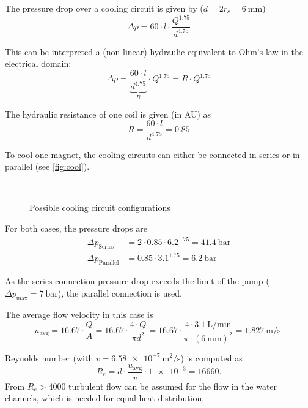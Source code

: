 \documentclass[10pt,a4paper,noendnumber=true]{scrartcl}
\begin{document}
The pressure drop over a cooling circuit is given by ($d=2r_c=\SI{6}{\mm}$)
\begin{equation}
    \Delta p = 60 \cdot l \cdot \frac{Q^{1.75}}{d^{4.75}} 
\end{equation}

This can be interpreted a (non-linear) hydraulic equivalent to Ohm's law in the electrical domain:
\begin{equation}
	\Delta p = \underbrace{\frac{60 \cdot l}{d^{4.75}}}_R \cdot Q^{1.75} = R \cdot Q^{1.75}
\end{equation}

The hydraulic resistance of one coil is given (in AU) as
\begin{equation}
R= \frac{60 \cdot l}{d^{4.75}} = 0.85
\end{equation}

To cool one magnet, the cooling circuits can either be connected in series or in parallel (see \autoref{fig:cool}).

\begin{figure}[H]
	\centering\setcounter{subfigure}{0}
	\\
	\caption{Possible cooling circuit configurations}\label{fig:cool}
\end{figure}

For both cases, the pressure drops are
\begin{align}
\Delta p_\text{Series} &= 2 \cdot 0.85 \cdot 6.2^{1.75} = \SI{41.4}{\bar} \\
\Delta p_\text{Parallel} &= 0.85 \cdot 3.1^{1.75} = \SI{6.2}{\bar}
\end{align}

As the series connection pressure drop exceeds the limit of the pump ($\Delta p_\text{max}=\SI{7}{\bar}$), the parallel connection is used.

The average flow velocity in this case is
\begin{equation}
    u_\text{avg} = 16.67 \cdot \frac{Q}{A} = 16.67 \cdot \frac{4\cdot Q}{\pi d^2} = 16.67 \cdot \frac{4 \cdot \SI{3.1}{\liter\per\minute}}{\pi \cdot (\SI{6}{\mm})^{2}} = \SI{1.827}{\meter\per\second}.
\end{equation}

Reynolds number (with $v=\SI{6.58e-7}{\meter\squared\per\second}$) is computed as
\begin{equation}
    R_e = d \cdot \frac{u_\text{avg}}{v} \cdot \num{1e-3} = \num{16660}.
\end{equation}
From $R_e>4000$ turbulent flow can be assumed for the flow in the water channels, which is needed for equal heat distribution.
\end{document}
